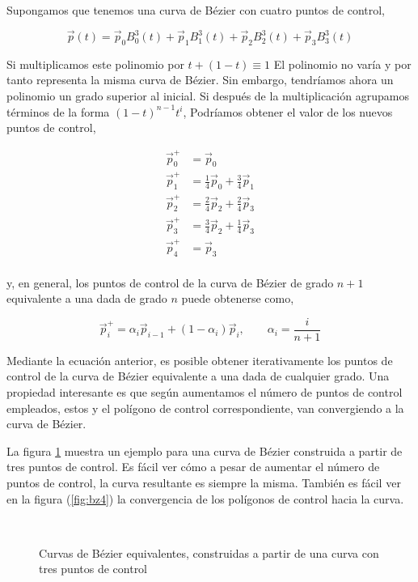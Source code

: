 Supongamos que tenemos una curva de Bézier con cuatro puntos de control,

\begin{equation*}
\vec{p}(t) = \vec{p}_0B_0^3(t) + \vec{p}_1B_1^3(t) + \vec{p}_2B_2^3(t) + \vec{p}_3B_3^3(t)
\end{equation*}

Si multiplicamos este polinomio por $ t + (1 -t) \equiv 1$ El polinomio no varía y por tanto representa la misma curva de Bézier. Sin embargo, tendríamos ahora un polinomio un grado superior al inicial.  Si después de la multiplicación agrupamos términos de la forma $(1-t)^{n-1}t^i$, Podríamos obtener el valor de los nuevos puntos de control,

\begin{align*}
\vec{p}_0^+&= \vec{p}_0\\
\vec{p}_1^+&= \frac{1}{4}\vec{p}_0 + \frac{3}{4}\vec{p}_1\\
\vec{p}_2^+&= \frac{2}{4}\vec{p}_2 + \frac{2}{4}\vec{p}_3\\
\vec{p}_3^+&= \frac{3}{4}\vec{p}_2 + \frac{1}{4}\vec{p}_3\\
\vec{p}_4^+&= \vec{p}_3\\
\end{align*}

y, en general, los puntos de control de la curva de Bézier de grado $n+1$ equivalente  a una dada de grado $n$ puede obtenerse como,

\begin{equation*}
\vec{p}_i^+ = \alpha_i\vec{p}_{i-1} + (1-\alpha_i)\vec{p}_i, \qquad \alpha_i =\frac{i}{n+1}
\end{equation*}

Mediante la ecuación anterior, es posible obtener iterativamente los puntos de control de la curva de Bézier equivalente a una dada de cualquier grado. Una propiedad interesante es que según aumentamos el número de puntos de control empleados, estos y el polígono de control correspondiente, van convergiendo a la curva de Bézier. 

La figura \ref{fig:bzgrad} muestra un ejemplo para una curva de Bézier construida a partir de tres puntos de control. Es fácil ver cómo a pesar de aumentar el número de puntos de control, la curva resultante es siempre la misma.  También es fácil ver en la figura (\ref{fig:bz4}) la convergencia de los polígonos de control hacia la curva.

\begin{figure}[h]
\centering
{} \qquad 
{}\\
 \qquad 
{}
\caption{Curvas de Bézier equivalentes, construidas a partir de una curva con tres puntos de control} 
\label{fig:bzgrad}
\end{figure}

